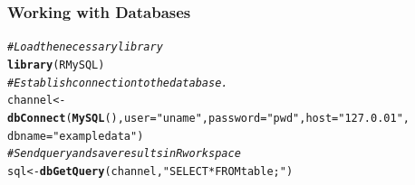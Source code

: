 \documentclass{beamer}\usepackage[]{graphicx}\usepackage[]{color}
\makeatletter
\newcommand{\hlstr}[1]{\textcolor[rgb]{0.192,0.494,0.8}{#1}}%
\newcommand{\hlcom}[1]{\textcolor[rgb]{0.678,0.584,0.686}{\textit{#1}}}%
\newcommand{\hlstd}[1]{\textcolor[rgb]{0.345,0.345,0.345}{#1}}%
\newcommand{\hlkwb}[1]{\textcolor[rgb]{0.69,0.353,0.396}{#1}}%
\newcommand{\hlkwc}[1]{\textcolor[rgb]{0.333,0.667,0.333}{#1}}%
\newcommand{\hlkwd}[1]{\textcolor[rgb]{0.737,0.353,0.396}{\textbf{#1}}}%
\newenvironment{kframe}{%
 \def\at@end@of@kframe{}%
 \ifinner\ifhmode%
  \def\at@end@of@kframe{\end{minipage}}%
  \begin{minipage}{\columnwidth}%
 \fi\fi%
 \def\FrameCommand##1{\hskip\@totalleftmargin \hskip-\fboxsep
 \colorbox{shadecolor}{##1}\hskip-\fboxsep
     \hskip-\linewidth \hskip-\@totalleftmargin \hskip\columnwidth}%
 \MakeFramed {\advance\hsize-\width
   \@totalleftmargin\z@ \linewidth\hsize
   \@setminipage}}%
 {\par\unskip\endMakeFramed%
 \at@end@of@kframe}
\newenvironment{knitrout}{}{} %
\makeatother
\begin{document}
\begin{frame}[fragile]
\frametitle{Working with Databases}

\begin{knitrout}\scriptsize
{}\color{fgcolor}\begin{kframe}
\begin{alltt}
\hlcom{# Load the necessary library}
\hlkwd{library}\hlstd{(RMySQL)}
\hlcom{# Establish connection to the database.}
\hlstd{channel} \hlkwb{<-} \hlkwd{dbConnect}\hlstd{(}\hlkwd{MySQL}\hlstd{(),} \hlkwc{user} \hlstd{=} \hlstr{"uname"}\hlstd{,} \hlkwc{password} \hlstd{=} \hlstr{"pwd"}\hlstd{,} \hlkwc{host} \hlstd{=} \hlstr{"127.0.01"}\hlstd{,}
    \hlkwc{dbname} \hlstd{=} \hlstr{"exampledata"}\hlstd{)}
\hlcom{# Send query and save results in R workspace}
\hlstd{sql} \hlkwb{<-} \hlkwd{dbGetQuery}\hlstd{(channel,} \hlstr{"SELECT * FROM table;"}\hlstd{)}
\end{alltt}
\end{kframe}
\end{knitrout}

\end{frame}
\end{document}
